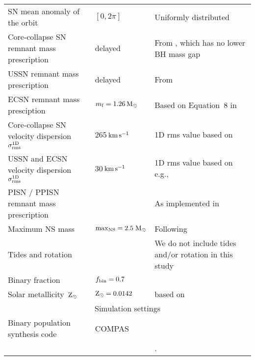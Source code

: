 \documentclass[twocolumn]{aastex631}
\newcommand{\Msun}{\ensuremath{\,\rm{M}_{\odot}}\xspace}
\newcommand{\Zsun}{\ensuremath{\,\rm{Z}_{\odot}}\xspace}
\newcommand{\kms}{\ensuremath{\,\rm{km}\,\rm{s}^{-1}}\xspace}
\begin{document}
\begin{table*}[ht!]
{\begin{tabular}{lll}
%
 {SN} mean anomaly of the orbit                    											&     $[0, 2\pi]$                             & Uniformly distributed  \\
Core-collapse  {SN} remnant mass prescription          									     &  delayed                     &  From \citet{Fryer_2012}, which  has no lower {BH} mass gap  \\%
%
USSN  remnant mass prescription          									     &  delayed                     &  From \citet{Fryer_2012}   \\%
%
ECSN  remnant mass presciption                        												&                                 $m_{\rm{f}} = 1.26\Msun$ &      Based on Equation~8 in \citet{Timmes_1996}          \\
%
Core-collapse  {SN}  velocity dispersion $\sigma_{\rm{rms}}^{\rm{1D}}$ 			& 265\kms           & 1D rms value based on              \citet{Hobbs_2005}                          \\
%
 USSN  and ECSN  velocity dispersion $\sigma_{\rm{rms}}^{\rm{1D}}$ 							 	& 30\kms             &            1D rms value based on e.g.,    \citet{Pfahl_2002, Podsiadlowski_2004}    \\
%
PISN / PPISN remnant mass prescription               											& \citet{Marchant_2019}                    &       As implemented in \citet{Stevenson_2019}      \\
Maximum NS mass                                      & $\rm{max}_{\rm{NS}} = 2.5$\Msun & Following \citet{Fryer_2012}            \\
Tides and rotation & & We do not include tides and/or rotation in this study\\
Binary fraction                                      & $f_{\rm{bin}} = 0.7$ &  \\
Solar metallicity \Zsun                             & $\rm{Z}_{\odot}\xspace = 0.0142$ & based on {\citet{Asplund_2009}} \\
%
%
\hline
\multicolumn{3}{c}{Simulation settings}                                                                     \\ \hline
Binary population synthesis code                                      & COMPAS &       \citet{Stevenson_2017, Barrett_2018, Vigna-Gomez_2018, Neijssel_2019} \\
& & \citet{Broekgaarden_2019, COMPAS_2022}.        \\
\hline \hline
\end{tabular}%
}
\end{table*}
\end{document}
